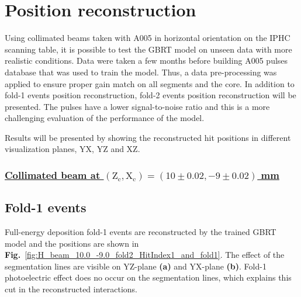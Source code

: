 \section{Position reconstruction}
\label{sec:position_reconstruction}
Using collimated beams taken with A005 in horizontal orientation on the IPHC scanning table, it is possible to test the GBRT model on unseen data with more realistic conditions. Data were taken a few months before building A005 pulses database that was used to train the model. Thus, a data pre-processing was applied to ensure proper gain match on all segments and the core. In addition to fold-1 events position reconstruction, fold-2 events position reconstruction will be presented. The pulses have a lower signal-to-noise ratio and this is a more challenging evaluation of the performance of the model.

Results will be presented by showing the reconstructed hit positions in different visualization planes, YX, YZ and XZ.

\subsubsection*{\underline{Collimated beam at $(\text{Z}_\text{c}, \text{X}_\text{c})= (10\pm0.02, -9\pm0.02)$ mm}}
\subsection{Fold-1 events}

Full-energy deposition fold-1 events are reconstructed by the trained GBRT model and the positions are shown in \textbf{Fig.}~\ref{fig:H_beam_10.0_-9.0_fold2_HitIndex1_and_fold1}. The effect of the segmentation lines are visible on YZ-plane \textbf{(a)} and YX-plane \textbf{(b)}. Fold-1 photoelectric effect does no occur on the segmentation lines, which explains this cut in the reconstructed interactions. 


